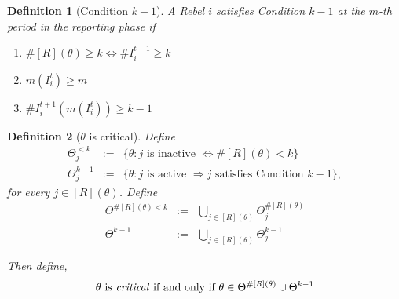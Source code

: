 \documentclass[12pt,letter]{article}
\newcommand{\Omicron}{\mathbb{R}}
\newtheorem{definition}{Definition}[section]
\theoremstyle{definition}
\theoremstyle{definition}
\theoremstyle{remark}
\theoremstyle{claim}
\begin{document}

\begin{definition}[Condition $k-1$]
A Rebel $i$ satisfies Condition $k-1$ at the $m$-th period in the reporting phase if
\begin{enumerate}
\item $\#[R](\theta)\geq k\Leftrightarrow\#I^{t+1}_i\geq k$
\item $m(I^t_i)\geq m$
\item $\#I^{t+1}_i(m(I^t_i))\geq k-1$
\end{enumerate}
\end{definition}



\begin{definition}[$\theta$ is critical]
Define
\begin{eqnarray*}
\Theta^{<k}_j & := & \{\theta:\text{$j$ is inactive }\Leftrightarrow\#[R](\theta)<k\} \\
\Theta^{k-1}_j & := & \{\theta:\text{$j$ is active }\Rightarrow \text{$j$ satisfies Condition $k-1$}\},
\end{eqnarray*}
for every $j\in [R](\theta)$. Define
\begin{eqnarray*}
\Theta^{\#[R](\theta)<k} & :=  &\bigcup_{j\in [R](\theta)}\Theta^{\#[R](\theta)}_j\\
\Theta^{k-1} & :=  &\bigcup_{j\in [R](\theta)}\Theta^{k-1}_j
\end{eqnarray*}

Then define, \[\text{$\theta$ is \textit{critical} if and only if $\theta\in \Theta^{\#[R](\theta)}\cup \Theta^{k-1}$}\]
\end{definition}






\end{document}
